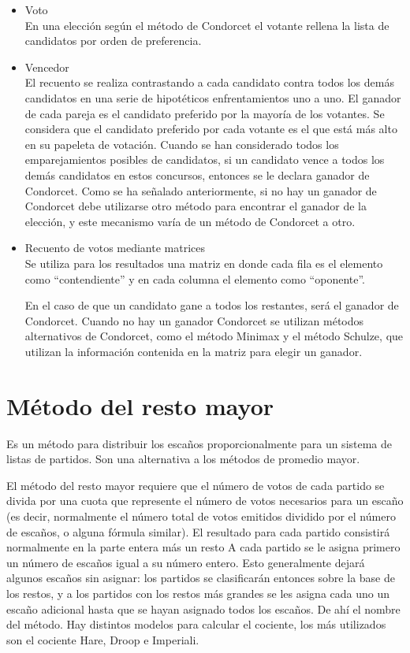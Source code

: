 \documentclass[12pt,a4paper,]{book}
\numberwithin{dummy}{section}
\theoremstyle{ocrenumbox}
\theoremstyle{blacknumex}
\theoremstyle{blacknumbox}
\theoremstyle{ocrenum}
\theoremstyle{ocrenum}
\begin{document}
\begin{itemize}
\item
  Voto\\
  En una elección según el método de Condorcet el votante rellena la
  lista de candidatos por orden de preferencia.
\item
  Vencedor\\
  El recuento se realiza contrastando a cada candidato contra todos los
  demás candidatos en una serie de hipotéticos enfrentamientos uno a
  uno. El ganador de cada pareja es el candidato preferido por la
  mayoría de los votantes. Se considera que el candidato preferido por
  cada votante es el que está más alto en su papeleta de votación.
  Cuando se han considerado todos los emparejamientos posibles de
  candidatos, si un candidato vence a todos los demás candidatos en
  estos concursos, entonces se le declara ganador de Condorcet. Como se
  ha señalado anteriormente, si no hay un ganador de Condorcet debe
  utilizarse otro método para encontrar el ganador de la elección, y
  este mecanismo varía de un método de Condorcet a otro.
\item
  Recuento de votos mediante matrices\\
  Se utiliza para los resultados una matriz en donde cada fila es el
  elemento como ``contendiente'' y en cada columna el elemento como
  ``oponente''.

  En el caso de que un candidato gane a todos los restantes, será el
  ganador de Condorcet. Cuando no hay un ganador Condorcet se utilizan
  métodos alternativos de Condorcet, como el método Minimax y el método
  Schulze, que utilizan la información contenida en la matriz para
  elegir un ganador.
\end{itemize}

\hypertarget{muxe9todo-del-resto-mayor}{%
\section{Método del resto mayor}\label{muxe9todo-del-resto-mayor}}

Es un método para distribuir los escaños proporcionalmente para un
sistema de listas de partidos. Son una alternativa a los métodos de
promedio mayor.

El método del resto mayor requiere que el número de votos de cada
partido se divida por una cuota que represente el número de votos
necesarios para un escaño (es decir, normalmente el número total de
votos emitidos dividido por el número de escaños, o alguna fórmula
similar). El resultado para cada partido consistirá normalmente en la
parte entera más un resto A cada partido se le asigna primero un número
de escaños igual a su número entero. Esto generalmente dejará algunos
escaños sin asignar: los partidos se clasificarán entonces sobre la base
de los restos, y a los partidos con los restos más grandes se les asigna
cada uno un escaño adicional hasta que se hayan asignado todos los
escaños. De ahí el nombre del método. Hay distintos modelos para
calcular el cociente, los más utilizados son el cociente Hare, Droop e
Imperiali.
\end{document}
